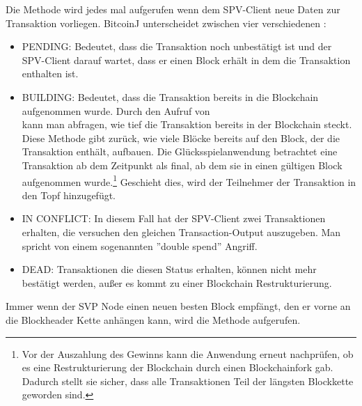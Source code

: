 
Die  Methode wird jedes mal aufgerufen wenn dem SPV-Client neue Daten zur Transaktion vorliegen. BitcoinJ unterscheidet zwischen vier verschiedenen :
\begin{itemize}
\item PENDING: Bedeutet, dass die Transaktion noch unbestätigt ist und der SPV-Client darauf wartet, dass er einen Block erhält in dem die Transaktion enthalten ist.
\item BUILDING: Bedeutet, dass die Transaktion bereits in die Blockchain aufgenommen wurde. Durch den Aufruf von\\  kann man abfragen, wie tief die Transaktion bereits in der Blockchain steckt. Diese Methode gibt zurück, wie viele Blöcke bereits auf den Block, der die Transaktion enthält, aufbauen. Die Glücksspielanwendung betrachtet eine Transaktion ab dem Zeitpunkt als final, ab dem sie in einen gültigen Block aufgenommen wurde.\footnote{Vor der Auszahlung des Gewinns kann die Anwendung erneut nachprüfen, ob es eine Restrukturierung der Blockchain durch einen Blockchainfork gab. Dadurch stellt sie sicher, dass alle Transaktionen Teil der längsten Blockkette geworden sind.} Geschieht dies, wird der Teilnehmer der Transaktion in den Topf hinzugefügt. 
\item IN CONFLICT: In diesem Fall hat der SPV-Client zwei Transaktionen erhalten, die versuchen den gleichen Transaction-Output auszugeben. Man spricht von einem sogenannten ''double spend'' Angriff. 
\item DEAD: Transaktionen die diesen Status erhalten, können nicht mehr bestätigt werden, außer es kommt zu einer Blockchain Restrukturierung.
\end{itemize}

Immer wenn der SVP Node einen neuen besten Block empfängt, den er vorne an die Blockheader Kette anhängen kann, wird die  Methode aufgerufen.



